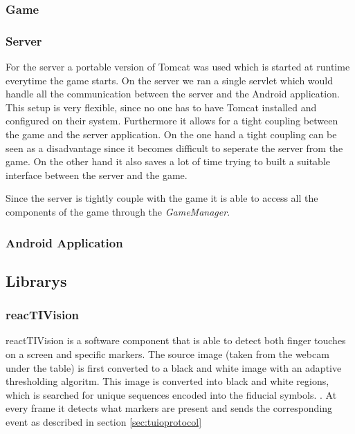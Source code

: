 \documentclass[a4paper,10pt]{article}
\begin{document}
		\subsubsection{Game}
		
		
		\subsubsection{Server}
		For the server a portable version of Tomcat was used which is started at runtime everytime the game starts.
		On the server we ran a single servlet which would handle all the communication between the server and the Android application.
		This setup is very flexible, since no one has to have Tomcat installed and configured on their system.
		Furthermore it allows for a tight coupling between the game and the server application.
		On the one hand a tight coupling can be seen as a disadvantage since it becomes difficult to seperate the server from the game.
		On the other hand it also saves a lot of time trying to built a suitable interface between the server and the game.
				
		Since the server is tightly couple with the game it is able to access all the components of the game through the \emph{GameManager}.
		
		\subsubsection{Android Application}
		
	\subsection{Librarys}%
		\subsubsection{reacTIVision}
		\label{sec:reactivision}
		reactTIVision is a software component that is able to detect both finger touches on a screen and specific markers. 
		The source image (taken from the webcam under the table) is first converted to a black and white image with an adaptive thresholding algoritm. 
		This image is converted into black and white regions, which is searched for unique sequences encoded into the fiducial symbols. \cite{reactivision}.
		At every frame it detects what markers are present and sends the corresponding event as described in section \ref{sec:tuioprotocol}
\end{document}
